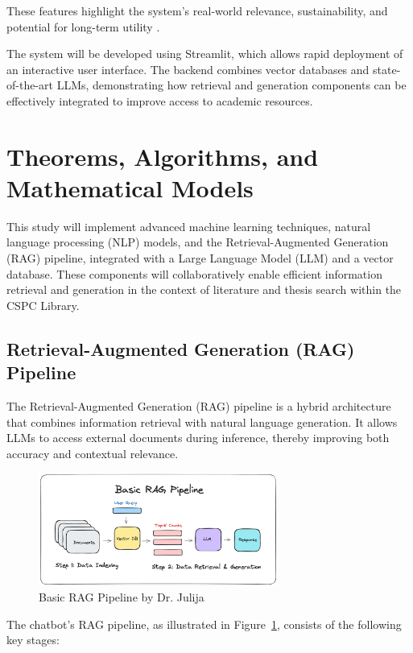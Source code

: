 \begin{refsection}
These features highlight the system's real-world relevance, sustainability, and potential for long-term utility \cite{hevner2004design}.

The system will be developed using Streamlit, which allows rapid deployment of an interactive user interface. The backend combines vector databases and state-of-the-art LLMs, demonstrating how retrieval and generation components can be effectively integrated to improve access to academic resources.

\section{Theorems, Algorithms, and Mathematical Models}

This study will implement advanced machine learning techniques, natural language processing (NLP) models, and the Retrieval-Augmented Generation (RAG) pipeline, integrated with a Large Language Model (LLM) and a vector database. These components will collaboratively enable efficient information retrieval and generation in the context of literature and thesis search within the CSPC Library.

\newpage
\clearpage
\subsection{Retrieval-Augmented Generation (RAG) Pipeline}

The Retrieval-Augmented Generation (RAG) pipeline is a hybrid architecture that combines information retrieval with natural language generation. It allows LLMs to access external documents during inference, thereby improving both accuracy and contextual relevance.

\begin{figure}[htbp]
    \centering
    \includegraphics[width=0.7\textwidth]{figures/rag.png}
    \caption{Basic RAG Pipeline by Dr. Julija}
    \label{fig:rag}
\end{figure}

The chatbot’s RAG pipeline, as illustrated in Figure~\ref{fig:rag}, consists of the following key stages:


\end{refsection}
